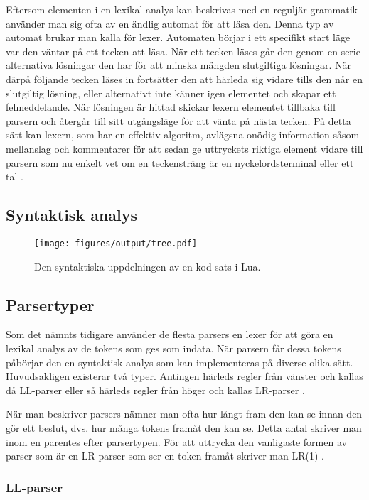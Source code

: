 Eftersom elementen i en lexikal analys kan beskrivas med en reguljär grammatik
använder man sig ofta av en ändlig automat för att läsa den. Denna typ av
automat brukar man kalla för lexer. Automaten börjar i ett specifikt start
läge var den väntar på ett tecken att läsa. När ett tecken läses går den genom
en serie alternativa lösningar den har för att minska mängden slutgiltiga
lösningar. När därpå följande tecken läses in fortsätter den att härleda sig
vidare tills den når en slutgiltig lösning, eller alternativt inte känner igen
elementet och skapar ett felmeddelande. När lösningen är hittad skickar lexern
elementet tillbaka till parsern och återgår till sitt utgångsläge för att
vänta på nästa tecken. På detta sätt kan lexern, som har en effektiv
algoritm, avlägsna onödig information såsom mellanslag och kommentarer för
att sedan ge uttryckets riktiga element vidare till parsern som nu enkelt vet
om en teckensträng är en nyckelordsterminal eller ett tal \citep[s.
51]{sm09}.

\subsection{Syntaktisk analys}

\begin{figure}[ht]
  \texttt{[image: figures/output/tree.pdf]}
  \caption{Den syntaktiska uppdelningen av en kod-sats i Lua.}
\end{figure}

\subsection{Parsertyper}

Som det nämnts tidigare använder de flesta parsers en lexer för att
göra en lexikal analys av de tokens som ges som indata. När parsern får dessa
tokens påbörjar den en syntaktisk analys som kan implementeras på diverse
olika sätt. Huvudsakligen existerar två typer. Antingen härleds regler från
vänster och kallas då LL-parser eller så härleds regler från höger och kallas
LR-parser \citep[s. 67]{sm09}.

När man beskriver parsers nämner man ofta hur långt fram den kan se innan den
gör ett beslut, dvs. hur många tokens framåt den kan se. Detta antal skriver
man inom en parentes efter parsertypen. För att uttrycka den vanligaste
formen av parser som är en LR-parser som ser en token framåt skriver man
LR(1) \citep[s. 69]{sm09}.

\subsubsection{LL-parser}

